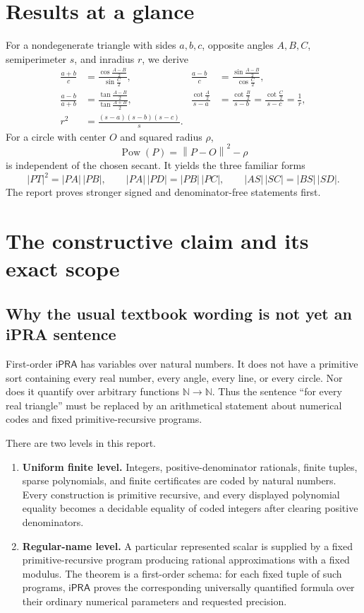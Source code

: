 \documentclass[11pt,letterpaper]{article}
\theoremstyle{definition}
\theoremstyle{remark}
\newcommand{\ipra}{\mathsf{iPRA}}
\newcommand{\N}{\mathbb N}
\newcommand{\Pow}{\operatorname{Pow}}
\newcommand{\norm}[1]{\left\lVert #1\right\rVert}
\begin{document}
\section*{Results at a glance}
For a nondegenerate triangle with sides \(a,b,c\), opposite angles
\(A,B,C\), semiperimeter \(s\), and inradius \(r\), we derive
\begin{align*}
 \frac{a+b}{c}
   &=\frac{\cos\frac{A-B}{2}}{\sin\frac C2},
&\frac{a-b}{c}
   &=\frac{\sin\frac{A-B}{2}}{\cos\frac C2},\\
 \frac{a-b}{a+b}
   &=\frac{\tan\frac{A-B}{2}}{\tan\frac{A+B}{2}},
&\frac{\cot\frac A2}{s-a}
   &=\frac{\cot\frac B2}{s-b}
    =\frac{\cot\frac C2}{s-c}=\frac1r,\\
 r^2&=\frac{(s-a)(s-b)(s-c)}s.
\end{align*}
For a circle with center \(O\) and squared radius \(\rho\),
\[
  \Pow(P)=\norm{P-O}^2-\rho
\]
is independent of the chosen secant.  It yields the three familiar forms
\[
 |PT|^2=|PA|\,|PB|,\qquad
 |PA|\,|PD|=|PB|\,|PC|,\qquad
 |AS|\,|SC|=|BS|\,|SD|.
\]
The report proves stronger signed and denominator-free statements first.

\newpage
\begingroup
\small
\setlength{\parskip}{0pt}
\tableofcontents
\endgroup
\newpage

\section{The constructive claim and its exact scope}
\label{sec:scope}

\subsection{Why the usual textbook wording is not yet an iPRA sentence}

First-order \(\ipra\) has variables over natural numbers.  It does not have a
primitive sort containing every real number, every angle, every line, or every
circle.  Nor does it quantify over arbitrary functions \(\N\to\N\).  Thus the
sentence ``for every real triangle'' must be replaced by an arithmetical
statement about numerical codes and fixed primitive-recursive programs.

There are two levels in this report.

\begin{enumerate}
\item \textbf{Uniform finite level.}  Integers, positive-denominator rationals,
finite tuples, sparse polynomials, and finite certificates are coded by natural
numbers.  Every construction is primitive recursive, and every displayed
polynomial equality becomes a decidable equality of coded integers after
clearing positive denominators.
\item \textbf{Regular-name level.}  A particular represented scalar is supplied
by a fixed primitive-recursive program producing rational approximations with a
fixed modulus.  The theorem is a first-order schema: for each fixed tuple of
such programs, \(\ipra\) proves the corresponding universally quantified
formula over their ordinary numerical parameters and requested precision.
\end{enumerate}
\end{document}
